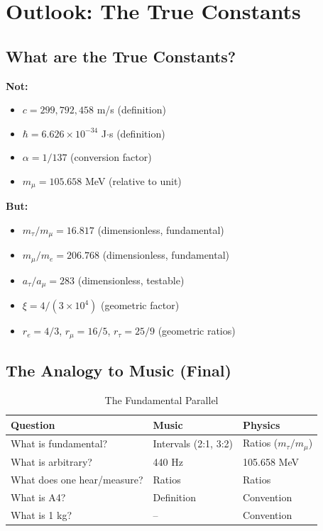 \section{Outlook: The True Constants}

\subsection{What are the True Constants?}

\textbf{Not:}
\begin{itemize}[nosep]
	\item $c = 299,792,458$ m/s (definition)
	\item $\hbar = 6.626 \times 10^{-34}$ J$\cdot$s (definition)
	\item $\alpha = 1/137$ (conversion factor)
	\item $m_\mu = 105.658$ MeV (relative to unit)
\end{itemize}

\textbf{But:}
\begin{itemize}[nosep]
	\item $m_\tau / m_\mu = 16.817$ (dimensionless, fundamental)
	\item $m_\mu / m_e = 206.768$ (dimensionless, fundamental)
	\item $a_\tau / a_\mu = 283$ (dimensionless, testable)
	\item $\xi = 4/(3 \times 10^4)$ (geometric factor)
	\item $r_e = 4/3$, $r_\mu = 16/5$, $r_\tau = 25/9$ (geometric ratios)
\end{itemize}

\subsection{The Analogy to Music (Final)}

\begin{table}[h]
	\centering
	\begin{tabular}{p{}p{}p{}}
		\toprule
		\textbf{Question} & \textbf{Music} & \textbf{Physics} \\
		\midrule
		What is fundamental? & Intervals (2:1, 3:2) & Ratios ($m_\tau/m_\mu$) \\
		What is arbitrary? & 440 Hz & 105.658 MeV \\
		What does one hear/measure? & Ratios & Ratios \\
		What is A4? & Definition & Convention \\
		What is 1 kg? & -- & Convention \\
		\bottomrule
	\end{tabular}
	\caption{The Fundamental Parallel}
\end{table}

